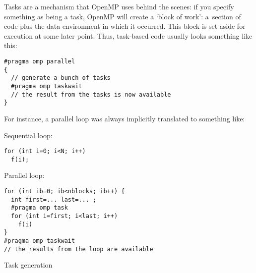 
\label{sec:omp:task}

Tasks are a mechanism that OpenMP uses behind the scenes:
if you specify something as being a task, OpenMP will create
a `block of work': a~section of code plus the data environment
in which it occurred. This block is set aside for execution at some later point.
Thus, task-based code usually looks something like this:
\begin{lstlisting}[language=omp]
#pragma omp parallel
{
  // generate a bunch of tasks
  #pragma omp taskwait
  // the result from the tasks is now available  
}
\end{lstlisting}
For instance, a parallel loop was always implicitly translated to something like:
\begin{multicols}{2}
Sequential loop:
\begin{lstlisting}[language=omp]
for (int i=0; i<N; i++)
  f(i);
\end{lstlisting}
\columnbreak
Parallel loop:
\begin{lstlisting}[language=omp]
for (int ib=0; ib<nblocks; ib++) {
  int first=... last=... ;
  #pragma omp task
  for (int i=first; i<last; i++)
    f(i)
}
#pragma omp taskwait
// the results from the loop are available
\end{lstlisting}
\end{multicols}

 {Task generation}

